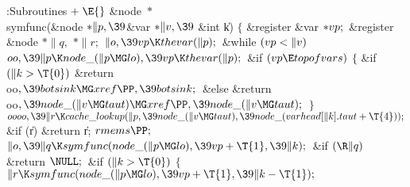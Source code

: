 \Y\B\4:Subroutines\X${}\mathrel+\E{}$\6
\&{node} ${}{*}{}$\\{symfunc}(\&{node} ${}{*}\|p,\39{}$\&{var} ${}{*}\|v,\39{}$%
\&{int} \|k)\1\1\2\2\6
${}\{{}$\1\6
\&{register} \&{var} ${}{*}\\{vp};{}$\6
\&{register} \&{node} ${}{*}\|q,{}$ ${}{*}\|r;{}$\7
${}\|o,\39\\{vp}\K\\{thevar}(\|p);{}$\6
\&{while} ${}(\\{vp}<\|v){}$\1\5
${}\\{oo},\39\|p\K\\{node\_}(\|p\MG\\{lo}),\39\\{vp}\K\\{thevar}(\|p);{}$\2\6
\&{if} ${}(\\{vp}\E\\{topofvars}){}$\5
${}\{{}$\1\6
\&{if} ${}(\|k>\T{0}){}$\1\5
\&{return} \\{oo}${},\39\\{botsink}\MG\\{xref}\PP,\39\\{botsink};{}$\2\6
\&{else}\1\5
\&{return} \\{oo}${},\39\\{node\_}(\|v\MG\\{taut})\MG\\{xref}\PP,\39\\{node\_}(%
\|v\MG\\{taut});{}$\2\6
\4${}\}{}$\2\6
${}\\{oooo},\39\|r\K\\{cache\_lookup}(\|p,\39\\{node\_}(\|v\MG\\{taut}),\39%
\\{node\_}(\\{varhead}[\|k].\\{taut}+\T{4}));{}$\6
\&{if} (\|r)\1\5
\&{return} \|r;\2\6
${}\\{rmems}\PP;{}$\6
${}\|o,\39\|q\K\\{symfunc}(\\{node\_}(\|p\MG\\{lo}),\39\\{vp}+\T{1},\39\|k);{}$%
\6
\&{if} ${}(\R\|q){}$\1\5
\&{return} ${}\NULL;{}$\2\6
\&{if} ${}(\|k>\T{0}){}$\5
${}\{{}$\1\6
${}\|r\K\\{symfunc}(\\{node\_}(\|p\MG\\{lo}),\39\\{vp}+\T{1},\39\|k-\T{1});{}$\6
